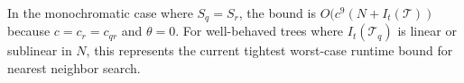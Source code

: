 
In the monochromatic case where $S_q = S_r$, the bound is $O(c^9 (N +
I_t(\mathscr{T}))$ because $c = c_r = c_{qr}$ and $\theta = 0$.  For
well-behaved trees where $I_t(\mathscr{T}_q)$ is linear or sublinear in $N$,
this represents the current tightest worst-case runtime bound for nearest
neighbor search.

